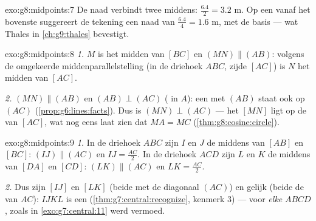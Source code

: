 \begin{solution}{exo:g8:midpoints:7}
De naad verbindt twee middens: $\frac{6.4}{2} = 3.2$ m. Op een  vanaf het
bovenste  suggereert de tekening een naad van $\frac{6.4}{4} = 1.6$ m,
 met de basis --- wat Thales in \cref{ch:g9:thales} bevestigt.
\end{solution}

\begin{solution}{exo:g8:midpoints:8}
\emph{1.} $M$ is het midden van $[BC]$ en $(MN) \parallel (AB)$: volgens de
omgekeerde middenparallelstelling (in de driehoek $ABC$, zijde $[AC]$) is $N$ het
midden van $[AC]$.

\emph{2.} $(MN) \parallel (AB)$ en $(AB) \perp (AC)$ ( in $A$): een
  met $(AB)$ staat ook  op $(AC)$
(\cref{prop:g6:lines:facts}). Dus is $(MN) \perp (AC)$ --- het  $[MN]$
ligt op de  van $[AC]$, wat nog eens laat zien dat $MA = MC$
(\cref{thm:g8:cosine:circle}).
\end{solution}

\begin{solution}{exo:g8:midpoints:9}
\emph{1.} In de driehoek $ABC$ zijn $I$ en $J$ de middens van $[AB]$ en $[BC]$:
$(IJ) \parallel (AC)$ en $IJ = \frac{AC}{2}$. In de driehoek $ACD$ zijn $L$ en
$K$ de middens van $[DA]$ en $[CD]$: $(LK) \parallel (AC)$ en
$LK = \frac{AC}{2}$.

\emph{2.} Dus zijn $[IJ]$ en $[LK]$  (beide  met de diagonaal
$(AC)$) en gelijk (beide de  van $AC$): $IJKL$ is een 
(\cref{thm:g7:central:recognize}, kenmerk 3) --- voor \emph{elke} 
$ABCD$, zoals in \cref{exo:g7:central:11} werd vermoed.
\end{solution}

